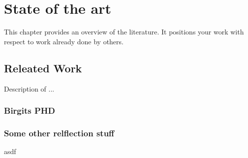 \chapter{State of the art}
This chapter provides an overview of the literature. It positions your work with respect to
work already done by others.
\section{Releated Work}
Description of ...

\subsection{Birgits PHD}

\subsection{Some other relflection stuff}
asdf

